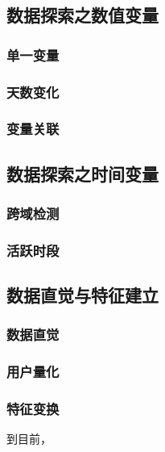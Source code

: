 \documentclass[withoutpreface,bwprint]{cumcmthesis}
\begin{document}
\subsection{数据探索之数值变量}

\subsubsection{单一变量}

\subsubsection{天数变化}

\subsubsection{变量关联}

\subsection{数据探索之时间变量}



\subsubsection{跨域检测}

\subsubsection{活跃时段}

\subsection{数据直觉与特征建立}



\subsubsection{数据直觉}

\subsubsection{用户量化}

\subsubsection{特征变换}

到目前，
\end{document}
